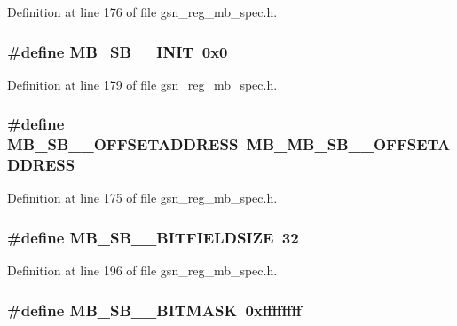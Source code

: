 Definition at line 176 of file gsn\_\-reg\_\-mb\_\-spec.h.

\hypertarget{a00562_ac6db6e00bb0cae0815327c336c6db3e4}{
\subsubsection[{MB\_\-SB\_\-0\_\-INIT}]{\setlength{\rightskip}{0pt plus 5cm}\#define MB\_\-SB\_\_\-INIT~0x0}}
\label{a00562_ac6db6e00bb0cae0815327c336c6db3e4}


Definition at line 179 of file gsn\_\-reg\_\-mb\_\-spec.h.

\hypertarget{a00562_af531a6325526adfff3ea06bef0036c6d}{
\subsubsection[{MB\_\-SB\_\-0\_\-OFFSETADDRESS}]{\setlength{\rightskip}{0pt plus 5cm}\#define MB\_\-SB\_\_\-OFFSETADDRESS~MB\_\-MB\_\-SB\_\_\-OFFSETADDRESS}}
\label{a00562_af531a6325526adfff3ea06bef0036c6d}


Definition at line 175 of file gsn\_\-reg\_\-mb\_\-spec.h.

\hypertarget{a00562_aadecf9282a8add55469fbb0594203756}{
\subsubsection[{MB\_\-SB\_\-1\_\-BITFIELDSIZE}]{\setlength{\rightskip}{0pt plus 5cm}\#define MB\_\-SB\_\_\-BITFIELDSIZE~32}}
\label{a00562_aadecf9282a8add55469fbb0594203756}


Definition at line 196 of file gsn\_\-reg\_\-mb\_\-spec.h.

\hypertarget{a00562_ab338d9ab36dfe47604d126a8b85d2c46}{
\subsubsection[{MB\_\-SB\_\-1\_\-BITMASK}]{\setlength{\rightskip}{0pt plus 5cm}\#define MB\_\-SB\_\_\-BITMASK~0xffffffff}}
\label{a00562_ab338d9ab36dfe47604d126a8b85d2c46}


